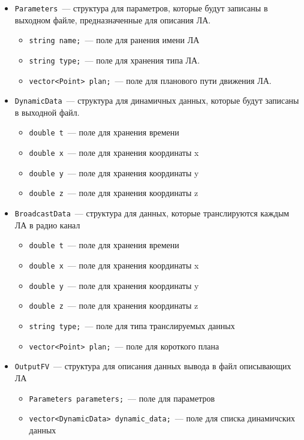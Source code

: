 \documentclass[a4paper,12pt]{article}
\numberwithin{figure}{subsubsection}
\begin{document}
\begin{itemize}
    \item \texttt{Parameters}~--- структура для параметров, которые будут записаны в выходном файле, предназначенные для описания ЛА.
    \begin{itemize}
        \item \texttt{string name;}~--- поле для ранения имени ЛА
        \item \texttt{string type;}~--- поле для хранения типа ЛА.
        \item \texttt{vector<Point> plan;}~--- поле для планового пути движения ЛА.
    \end{itemize}
    \item \texttt{DynamicData}~--- структура для динамичных данных, которые будут записаны в выходной файл. 
    \begin{itemize}
        \item \texttt{double t}~--- поле для хранения времени 
        \item \texttt{double x}~--- поле для хранения координаты x
        \item \texttt{double y}~--- поле для хранения координаты y
        \item \texttt{double z}~--- поле для хранения координаты z 
    \end{itemize}
    \item \texttt{BroadcastData}~--- структура для данных, которые транслируются каждым ЛА в радио канал
    \begin{itemize}
        \item \texttt{double t}~--- поле для хранения времени 
        \item \texttt{double x}~--- поле для хранения координаты x
        \item \texttt{double y}~--- поле для хранения координаты y
        \item \texttt{double z}~--- поле для хранения координаты z
        \item \texttt{string type;}~--- поле для типа транслируемых данных
       \item \texttt{vector<Point> plan;}~--- поле для короткого плана
    \end{itemize}
    \item \texttt{OutputFV}~--- структура для описания данных вывода в файл описывающих ЛА
    \begin{itemize}
        \item \texttt{Parameters parameters;}~--- поле для параметров
        \item \texttt{vector<DynamicData> dynamic\_data;}~--- поле для списка динамичских данных

\end{itemize}
\end{itemize}
\end{document}
